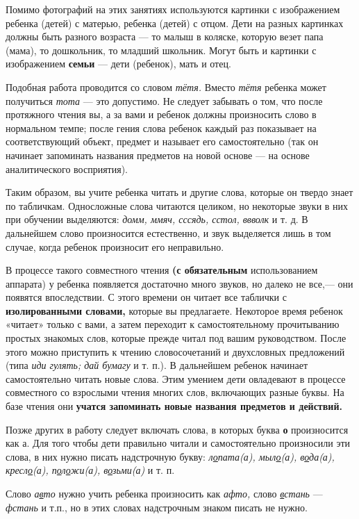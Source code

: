 \documentclass{book}
\renewcommand{\emph}[1]{\textit{#1}}
\begin{document}
Помимо фотографий на этих занятиях используются картинки с изображением
ребенка (детей) с матерью, ребенка (детей) с отцом. Дети на разных
картинках должны быть разного возраста --- то малыш в коляске, которую
везет папа (мама), то дошкольник, то младший школьник. Могут быть и
картинки с изображением \textbf{семьи} --- дети (ребенок), мать и отец.

Подобная работа проводится со словом \emph{тётя.} Вместо \emph{тётя}
ребенка может получиться \emph{тота} --- это допустимо. Не следует
забывать о том, что после протяжного чтения вы, а за вами и ребенок
должны произносить слово в нормальном темпе; после гения слова ребенок
каждый раз показывает на соответствующий объект, предмет и называет его
самостоятельно (так он начинает запоминать названия предметов на новой
основе --- на основе аналитического восприятия).

Таким образом, вы учите ребенка читать и другие слова, которые он твердо
знает по табличкам. Односложные слова читаются целиком, но некоторые
звуки в них при обучении выделяются: \emph{домм, ммяч, сссядь, сстол,
ввволк} и т. д. В дальнейшем слово произносится естественно, и звук
выделяется лишь в том случае, когда ребенок произносит его неправильно.

В процессе такого совместного чтения \textbf{(с обязательным}
использованием аппарата) у ребенка появляется достаточно много звуков,
но далеко не все,--- они появятся впоследствии. С этого времени он
читает все таблички с \textbf{изолированными словами,} которые вы
предлагаете. Некоторое время ребенок «читает» только с вами, а затем
переходит к самостоятельному прочитыванию простых знакомых слов, которые
прежде читал под вашим руководством. После этого можно приступить к
чтению словосочетаний и двухсловных предложений (типа \emph{иди гулять;
дай бумагу} и т. п.). В дальнейшем ребенок начинает самостоятельно
читать новые слова. Этим умением дети овладевают в процессе совместного
со взрослыми чтения многих слов, включающих разные буквы. На базе чтения
они \textbf{учатся запоминать новые названия предметов и действий.}

Позже других в работу следует включать слова, в которых буква \textbf{о}
произносится как а. Для того чтобы дети правильно читали и
самостоятельно произносили эти слова, в них нужно писать надстрочную
букву: \emph{л\uline{о}пата(а), мыл\uline{о}(а), в\uline{о}да(а),
кресл\uline{о}(а), п\uline{о}л\uline{о}жи(а), в\uline{о}зьми(а)} и т. п.

Слово \emph{а\uline{в}то} нужно учить ребенка произносить как
\emph{афто,} слово \emph{\uline{в}стань} --- \emph{фстань} и т.п., но в
этих словах надстрочным знаком писать не нужно.
\end{document}
